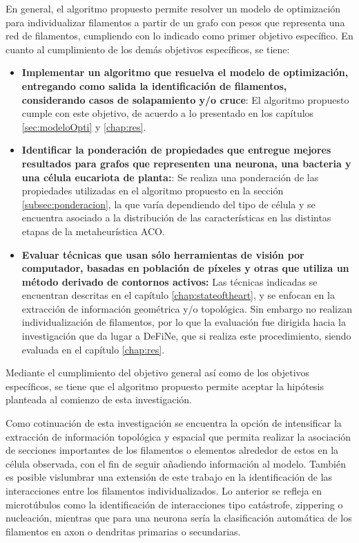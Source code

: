 En general, el algoritmo propuesto permite resolver un modelo de optimizaci\'on para individualizar filamentos a partir de un grafo con pesos que representa una red de filamentos, cumpliendo con lo indicado como primer objetivo espec\'ifico. En cuanto al cumplimiento de los dem\'as objetivos espec\'ificos, se tiene:
\begin{itemize}
    \item {\bf Implementar un algoritmo que resuelva el modelo de optimizaci\'on, entregando como salida la identificaci\'on de filamentos, considerando casos de solapamiento y/o cruce}: El algoritmo propuesto cumple con este objetivo, de acuerdo a lo presentado en los cap\'itulos \ref{sec:modeloOpti} y \ref{chap:res}.
    
    \item {\bf Identificar la ponderaci\'on de propiedades que entregue mejores resultados para grafos que representen una neurona, una bacteria y una c\'elula eucariota de planta:}: Se realiza una ponderaci\'on de las propiedades utilizadas en el algoritmo propuesto en la secci\'on \ref{subsec:ponderacion}, la que var\'ia dependiendo del tipo de c\'elula y se encuentra asociado a la distribuci\'on de las caracter\'isticas en las distintas etapas de la metaheur\'istica ACO.
    
    \item {\bf Evaluar t\'ecnicas que usan s\'olo herramientas de visi\'on por computador, basadas en poblaci\'on de p\'ixeles y otras que utiliza un m\'etodo derivado de contornos activos:} Las t\'ecnicas indicadas se encuentran descritas en el cap\'itulo \ref{chap:stateoftheart}, y se enfocan en la extracci\'on de informaci\'on geom\'etrica y/o topol\'ogica. Sin embargo no realizan individualizaci\'on de filamentos, por lo que la evaluaci\'on fue dirigida hacia la investigaci\'on que da lugar a DeFiNe, que si realiza este procedimiento, siendo evaluada en el cap\'itulo \ref{chap:res}.
\end{itemize}

Mediante el cumplimiento del objetivo general as\'i como de los objetivos espec\'ificos, se tiene que el algoritmo propuesto permite aceptar la hip\'otesis planteada al comienzo de esta investigaci\'on.

Como cotinuaci\'on de esta investigaci\'on se encuentra la opci\'on de intensificar la extracci\'on de informaci\'on topol\'ogica y espacial que permita realizar la asociaci\'on de secciones importantes de los filamentos o elementos alrededor de estos en la c\'elula observada, con el fin de seguir a\~nadiendo informaci\'on al modelo. Tambi\'en es posible vislumbrar una extensi\'on de este trabajo en la identificaci\'on de las interacciones entre los filamentos individualizados. Lo anterior se refleja en microt\'ubulos como la identificaci\'on de interacciones tipo cat\'astrofe, zippering o nucleaci\'on, mientras que para una neurona ser\'ia la clasificaci\'on autom\'atica de los filamentos en axon o dendritas primarias o secundarias.